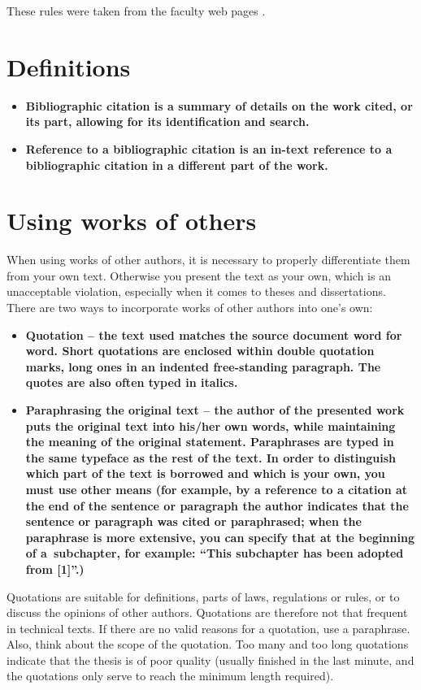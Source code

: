 These rules were taken from the faculty web pages \cite{citace}.

\section{Definitions}

\begin{itemize}
  \item{\bf Bibliographic citation \rm is a summary of details on the work cited, or its part, allowing for its identification and search.}
  \item{\bf Reference to a bibliographic citation \rm is an in-text reference to a bibliographic citation in a different part of the work.}
\end{itemize}

\section{Using works of others}

When using works of other authors, it is necessary to properly differentiate them from your own text. Otherwise you present the text as your own, which is an unacceptable violation, especially when it comes to theses and dissertations. There are two ways to incorporate works of other authors into one's own:

\begin{itemize}
  \item{\bf Quotation \rm -- the text used matches the source document word for word. Short quotations are enclosed within double quotation marks, long ones in an indented free-standing paragraph. 
The quotes are also often typed in italics.}
  \item{\bf Paraphrasing the original text \rm -- the author of the presented work puts the original text into his/her own words, while maintaining the meaning of the original statement. Paraphrases are typed in the same typeface as the rest of the text. In order to distinguish which part of the text is borrowed and which is your own, you must use other means (for example, by a reference to a citation at the end of the sentence or paragraph the author indicates that the sentence or paragraph was cited or paraphrased; when the paraphrase is more extensive, you can specify that at the beginning of a~subchapter, for example: ``This subchapter has been adopted from [1]''.)} 
\end{itemize}

Quotations are suitable for definitions, parts of laws, regulations or rules, or to discuss the opinions of other authors. Quotations are therefore not that frequent in technical texts. If there are no valid reasons for a quotation, use a paraphrase. Also, think about the scope of the quotation. Too many and too long quotations indicate that the thesis is of poor quality (usually finished in the last minute, and the quotations only serve to reach the minimum length required).


